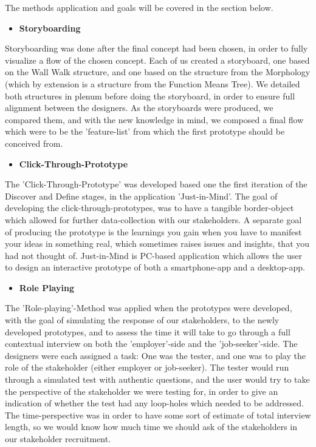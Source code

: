 The methods application and goals will be covered in the section below.

\begin{itemize}
    \item \bf{Storyboarding}
\end{itemize}

Storyboarding was done after the final concept had been chosen, in order to fully visualize a flow of the chosen concept. Each of us created a storyboard, one based on the Wall Walk structure, and one based on the structure from the Morphology (which by extension is a structure from the Function Means Tree). We detailed both structures in plenum before doing the storyboard, in order to ensure full alignment between the designers. As the storyboards were produced, we compared them, and with the new knowledge in mind, we composed a final flow which were to be the 'feature-list' from which the first prototype should be conceived from. 

\begin{itemize}
    \item \bf{Click-Through-Prototype}
\end{itemize}

The 'Click-Through-Prototype' was developed based one the first iteration of the Discover and Define stages, in the application 'Just-in-Mind'. The goal of developing the click-through-prototypes, was to have a tangible border-object which allowed for further data-collection with our stakeholders. A separate goal of producing the prototype is the learnings you gain when you have to manifest your ideas in something real, which sometimes raises issues and insights, that you had not thought of. Just-in-Mind is PC-based application which allows the user to design an interactive prototype of both a smartphone-app and a desktop-app.

\begin{itemize}
    \item \bf{Role Playing}
\end{itemize}

The 'Role-playing'-Method was applied when the prototypes were developed, with the goal of simulating the response of our stakeholders, to the newly developed prototypes, and to assess the time it will take to go through a full contextual interview on both the 'employer'-side and the 'job-seeker'-side. The designers were each assigned a task: One was the tester, and one was to play the role of the stakeholder (either employer or job-seeker). The tester would run through a simulated test with authentic questions, and the user would try to take the perspective of the stakeholder we were testing for, in order to give an indication of whether the test had any loop-holes which needed to be addressed. The time-perspective was in order to have some sort of estimate of total interview length, so we would know how much time we should ask of the stakeholders in our stakeholder recruitment.

